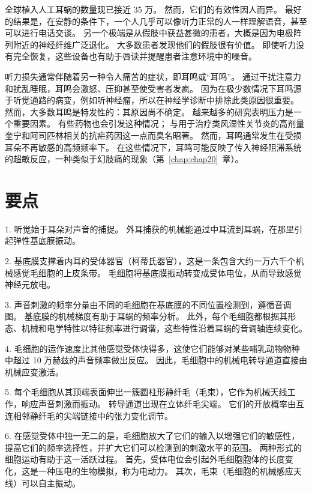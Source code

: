 全球植入人工耳蜗的数量现已接近 35 万。
然而，它们的有效性因人而异。
最好的结果是，在安静的条件下，一个人几乎可以像听力正常的人一样理解语音，甚至可以进行电话交谈。
另一个极端是从假肢中获益甚微的患者，大概是因为电极阵列附近的神经纤维广泛退化。
大多数患者发现他们的假肢很有价值。
即使听力没有完全恢复，这些设备也有助于唇读并提醒患者注意环境中的噪音。


听力损失通常伴随着另一种令人痛苦的症状，即耳鸣或“耳鸣”。
通过干扰注意力和扰乱睡眠，耳鸣会激怒、压抑甚至使受害者发疯。
因为在极少数情况下耳鸣源于听觉通路的病变，例如听神经瘤，所以在神经学诊断中排除此类原因很重要。
然而，大多数耳鸣是特发性的：其原因尚不确定。
越来越多的研究表明压力是一个重要因素。
有些药物也会引发这种情况；
与用于治疗类风湿性关节炎的高剂量奎宁和阿司匹林相关的抗疟药因这一点而臭名昭著。
然而，耳鸣通常发生在受损耳朵不再敏感的高频频率下。
在这些情况下，耳鸣可能反映了传入神经阻滞系统的超敏反应，一种类似于幻肢痛的现象（第~\ref{chap:chap20}~章）。



\section{要点}

1. 听觉始于耳朵对声音的捕捉。
外耳捕获的机械能通过中耳流到耳蜗，在那里引起弹性基底膜振动。


2. 基底膜支撑着内耳的受体器官（柯蒂氏器官），这是一条包含大约一万六千个机械感觉毛细胞的上皮条带。
毛细胞将基底膜振动转变成受体电位，从而导致感觉神经元放电。


3. 声音刺激的频率分量由不同的毛细胞在基底膜的不同位置检测到，遵循音调图。
基底膜的机械梯度有助于耳蜗的频率分析。
此外，每个毛细胞都根据其形态、机械和电学特性以特征频率进行调谐，这些特性沿着耳蜗的音调轴连续变化。 


4. 毛细胞的运作速度比其他感觉受体快得多，这使它们能够对某些哺乳动物物种中超过 10 万赫兹的声音频率做出反应。
因此，毛细胞中的机械电转导通道直接由机械应变激活。 


5. 每个毛细胞从其顶端表面伸出一簇圆柱形静纤毛（毛束），它作为机械天线工作，响应声音刺激而振动。
转导通道出现在立体纤毛尖端。
它们的开放概率由互连相邻静纤毛的尖端链接中的张力变化调节。


6. 在感觉受体中独一无二的是，毛细胞放大了它们的输入以增强它们的敏感性，提高它们的频率选择性，并扩大它们可以检测到的刺激水平的范围。
两种形式的细胞运动有助于这一活跃过程。
首先，受体电位会引起外毛细胞胞体的长度变化，这是一种压电的生物模拟，称为电动力。
其次，毛束（毛细胞的机械感应天线）可以自主振动。


